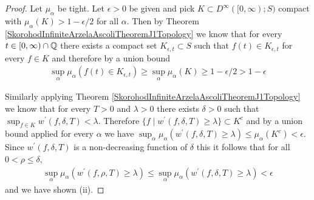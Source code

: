 \begin{proof}
Let $\mu_\alpha$ be tight.  Let $\epsilon > 0$ be given and pick
$K \subset D^\infty([0,\infty); S)$ compact with $\mu_\alpha(K) >
1-\epsilon/2$ for all $\alpha$.  Then by Theorem \ref{SkorohodInfiniteArzelaAscoliTheoremJ1Topology} we know that 
for every $t \in [0,\infty) \cap \mathbb{Q}$ there exists a compact set $K_{\epsilon,t} \subset S$ such that
$f(t) \in K_{\epsilon,t}$ for every $f \in K$ and therefore by a union bound
\begin{align*}
\sup_\alpha \mu_\alpha(f(t) \in K_{\epsilon,t}) \geq \sup_\alpha \mu_\alpha(K) \geq 1 - \epsilon/2 > 1 - \epsilon
\end{align*}

Similarly applying Theorem \ref{SkorohodInfiniteArzelaAscoliTheoremJ1Topology} we know that for
every $T > 0$ and $\lambda>0$
there exists $\delta>0$ such that $\sup_{f \in K} w^\prime(f, \delta, T) <
\lambda$.  Therefore $\lbrace f \mid w^\prime(f, \delta, T) \geq \lambda \rbrace
\subset K^c$ and by a union bound applied for every $\alpha$ we have $\sup_\alpha \mu_\alpha(w^\prime(f, \delta, T) \geq  \lambda) 
\leq \mu_\alpha(K^c) < \epsilon$.  Since $w^\prime(f, \delta, T)$ is a non-decreasing function of $\delta$ this it follows that for all $0 < \rho \leq \delta$,
\begin{align*}
\sup_\alpha \mu_\alpha(w^\prime(f, \rho, T) \geq  \lambda)  \leq \sup_\alpha \mu_\alpha(w^\prime(f, \delta, T) \geq  \lambda)  < \epsilon
\end{align*}
and we have shown (ii).


\end{proof}
